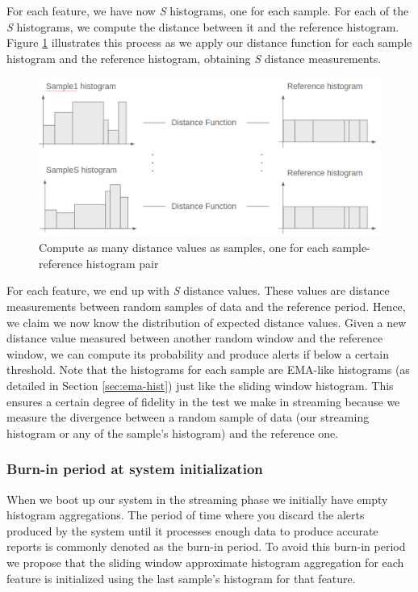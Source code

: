 For each feature, we have now \textit{S} histograms, one for each sample. For each of the \textit{S} histograms, we compute the distance between it and the reference histogram. Figure \ref{fig:compute-sample-distances} illustrates this process as we apply our distance function for each sample histogram and the reference histogram, obtaining \textit{S} distance measurements.

\begin{figure}[!htb]
    \begin{center}
      \includegraphics[scale=0.4]{figures/compute-sample-distances.png}
      \caption[Compute as many distance values as samples]{Compute as many distance values as samples, one for each sample-reference histogram pair}
      \label{fig:compute-sample-distances}
    \end{center}
\end{figure}

For each feature, we end up with \textit{S} distance values. These values are distance measurements between random samples of data and the reference period. Hence, we claim we now know the distribution of expected distance values. Given a new distance value measured between another random window and the reference window, we can compute its probability and produce alerts if below a certain threshold. Note that the histograms for each sample are EMA-like histograms (as detailed in Section \ref{sec:ema-hist}) just like the sliding window histogram. This ensures a certain degree of fidelity in the test we make in streaming because we measure the divergence between a random sample of data (our streaming histogram or any of the sample's histogram) and the reference one.


\subsubsection*{Burn-in period at system initialization}
When we boot up our system in the streaming phase we initially have empty histogram aggregations. The period of time where you discard the alerts produced by the system until it processes enough data to produce accurate reports is commonly denoted as the burn-in period. To avoid this burn-in period we propose that the sliding window approximate histogram aggregation for each feature is initialized using the last sample's histogram for that feature.

